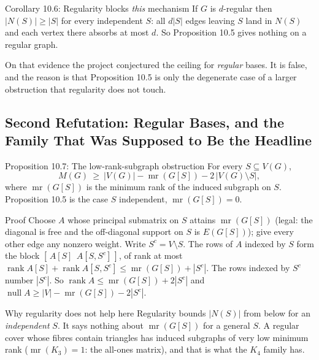 \documentclass[11pt]{article}
\begin{document}
\begin{thmbox}{Corollary 10.6: Regularity blocks \emph{this} mechanism}
If $G$ is $d$-regular then $|N(S)|\ge|S|$ for every independent $S$: all $d|S|$ edges leaving $S$ land in $N(S)$ and each vertex there absorbs at most $d$. So Proposition 10.5 gives nothing on a regular graph.
\end{thmbox}

On that evidence the project conjectured the ceiling for \emph{regular} bases. It is false, and the reason is that Proposition 10.5 is only the degenerate case of a larger obstruction that regularity does not touch.

\subsection{Second Refutation: Regular Bases, and the Family That Was Supposed to Be the Headline}

\begin{thmbox}{Proposition 10.7: The low-rank-subgraph obstruction}
For every $S\subseteq V(G)$,
\begin{equation}
  M(G)\ \ge\ |V(G)|-\operatorname{mr}(G[S])-2\,|V(G)\setminus S| ,
\end{equation}
where $\operatorname{mr}(G[S])$ is the minimum rank of the induced subgraph on $S$. Proposition 10.5 is the case $S$ independent, $\operatorname{mr}(G[S])=0$.
\end{thmbox}

\begin{defbox}{Proof}
Choose $A$ whose principal submatrix on $S$ attains $\operatorname{mr}(G[S])$ (legal: the diagonal is free and the off-diagonal support on $S$ is $E(G[S])$); give every other edge any nonzero weight. Write $S^c=V\setminus S$. The rows of $A$ indexed by $S$ form the block $[\,A[S]\ \ A[S,S^c]\,]$, of rank at most $\operatorname{rank}A[S]+\operatorname{rank}A[S,S^c]\le\operatorname{mr}(G[S])+|S^c|$. The rows indexed by $S^c$ number $|S^c|$. So $\operatorname{rank}A\le\operatorname{mr}(G[S])+2|S^c|$ and $\operatorname{null}A\ge|V|-\operatorname{mr}(G[S])-2|S^c|$. \qedhere
\end{defbox}

\begin{intubox}{Why regularity does not help here}
Regularity bounds $|N(S)|$ from below for an \emph{independent} $S$. It says nothing about $\operatorname{mr}(G[S])$ for a general $S$. A regular cover whose fibres contain triangles has induced subgraphs of very low minimum rank ($\operatorname{mr}(K_3)=1$: the all-ones matrix), and that is what the $K_4$ family has.
\end{intubox}
\end{document}
